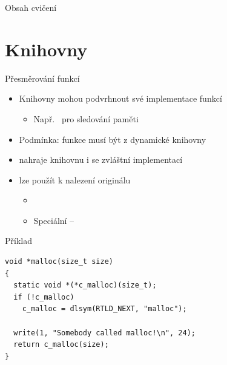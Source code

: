 


\subtitle{XII. Knihovny}
\date{6. 12. \the\year}


\shorthandoff{-}

\frame{\titlepage}


\begin{frame}{Obsah cvičení}

  \tableofcontents

\end{frame}

\section{Knihovny}
\frame{\sectionpage}



\begin{frame}[fragile]{Přesměrování funkcí}

  \begin{itemize}
    \item Knihovny mohou podvrhnout své implementace funkcí
    \begin{itemize}
      \item Např.\  pro sledování paměti
    \end{itemize}

    \pause

    \item Podmínka: funkce musí být z dynamické knihovny

    \pause

    \item {} nahraje knihovnu i se zvláštní implementací

    \pause

    \item {} lze použít k nalezení originálu
    \begin{itemize}
      \item {}
      \item Speciální  -- 
    \end{itemize}
  \end{itemize}

  \begin{block}{Příklad}
  \begin{lstlisting}[aboveskip=2pt,belowskip=2pt]
void *malloc(size_t size)
{
  static void *(*c_malloc)(size_t);
  if (!c_malloc)
    c_malloc = dlsym(RTLD_NEXT, "malloc");

  write(1, "Somebody called malloc!\n", 24);
  return c_malloc(size);
}
  \end{lstlisting}
  \end{block}

\end{frame}

